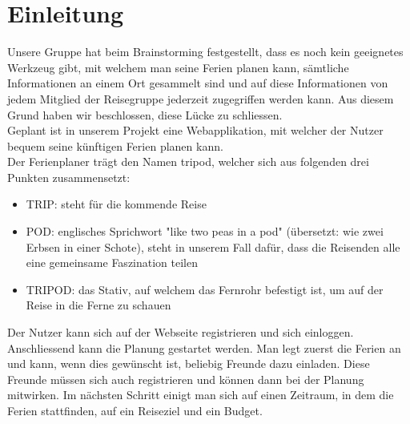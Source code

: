 \documentclass[10pt,a4paper,titlepage,twoside,german,final]{zhawreprt}
\numberwithin{table}{chapter}
\begin{document}

\tableofcontents

\chapter{Einleitung}\label{chp:Introduction}
Unsere Gruppe hat beim Brainstorming festgestellt, dass es noch kein geeignetes Werkzeug gibt, mit welchem man seine Ferien planen kann, sämtliche Informationen an einem Ort gesammelt sind und auf diese Informationen von jedem Mitglied der Reisegruppe jederzeit zugegriffen werden kann. Aus diesem Grund haben wir beschlossen, diese Lücke zu schliessen.\\
Geplant ist in unserem Projekt eine Webapplikation, mit welcher der Nutzer bequem seine künftigen Ferien planen kann.\\
Der Ferienplaner trägt den Namen \gls{tripod}, welcher sich aus folgenden drei Punkten zusammensetzt:
\begin{itemize}
\item TRIP: steht für die kommende Reise
\item POD: englisches Sprichwort "like two peas in a pod" (übersetzt: wie zwei Erbsen in einer Schote), steht in unserem Fall dafür, dass die Reisenden alle eine gemeinsame Faszination teilen
\item TRIPOD: das Stativ, auf welchem das Fernrohr befestigt ist, um auf der Reise in die Ferne zu schauen
\end{itemize}
Der Nutzer kann sich auf der Webseite registrieren und sich einloggen. Anschliessend kann die Planung gestartet werden. Man legt zuerst die Ferien an und kann, wenn dies gewünscht ist, beliebig Freunde dazu einladen. Diese Freunde müssen sich auch registrieren und können dann bei der Planung mitwirken. Im nächsten Schritt einigt man sich auf einen Zeitraum, in dem die Ferien stattfinden, auf ein Reiseziel und ein Budget.\\
\end{document}
